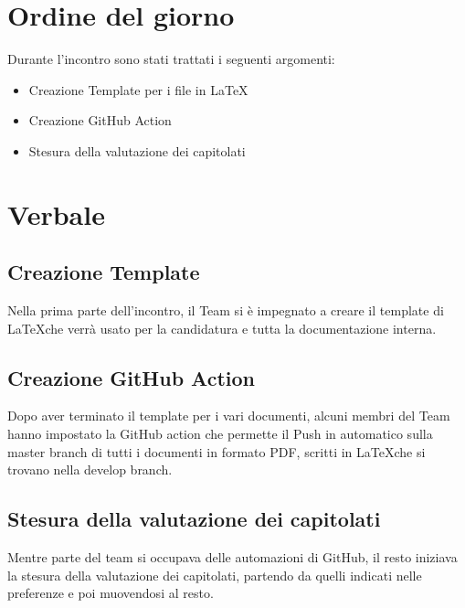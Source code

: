 \documentclass[italian, 12pt]{article}
\begin{document}
\section{Ordine del giorno}
Durante l'incontro sono stati trattati i seguenti argomenti: 
\begin{flushleft}
        \begin{itemize}
            \item Creazione Template per i file in \LaTeX
            \item Creazione GitHub Action 
            \item Stesura della valutazione dei capitolati
        \end{itemize}
\end{flushleft}
\newpage

\section{Verbale}
\subsection{Creazione Template}
Nella prima parte dell'incontro, il Team si è impegnato a creare il template di \LaTeX che verrà usato per la candidatura e tutta la documentazione interna.

\subsection{Creazione GitHub Action}
Dopo aver terminato il template per i vari documenti, alcuni membri del Team hanno impostato la GitHub action che permette il Push in automatico sulla master branch di tutti i documenti in formato PDF, scritti in \LaTeX che si trovano nella develop branch.

\subsection{Stesura della valutazione dei capitolati}
Mentre parte del team si occupava delle automazioni di GitHub, il resto iniziava la stesura della valutazione dei capitolati, partendo da quelli indicati nelle preferenze e poi muovendosi al resto. 
\end{document}
